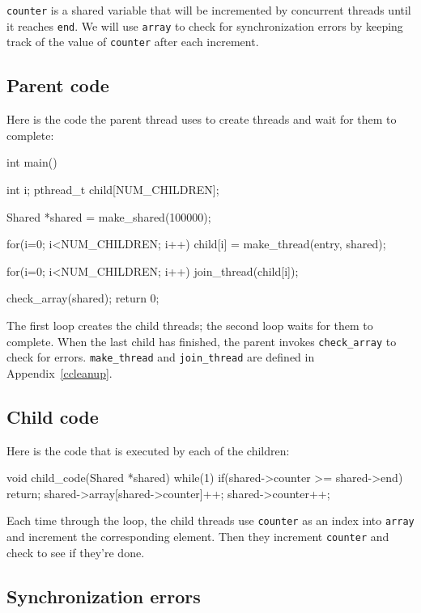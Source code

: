 \documentclass{book}
\begin{document}
{\tt counter} is a shared variable that will be incremented by
concurrent threads until it reaches {\tt end}.  We will use
    {\tt array} to check for synchronization errors by keeping track
of the value of {\tt counter} after each increment.

\subsection{Parent code}

Here is the code the parent thread uses to create threads
and wait for them to complete:

\begin{unbreakable}[]{}
int main() {
 int i;
 pthread_t child[NUM_CHILDREN];

 Shared *shared = make_shared(100000);

 for(i=0; i<NUM_CHILDREN; i++) {
  child[i] = make_thread(entry, shared);
 }

 for(i=0; i<NUM_CHILDREN; i++) {
  join_thread(child[i]);
 }

 check_array(shared);
 return 0;
}
\end{unbreakable}

The first loop creates the child threads; the second loop waits
for them to complete.  When the last child has finished, the parent
invokes {\tt check\_array} to check for errors.
    {\tt make\_thread} and {\tt join\_thread} are defined in
Appendix~\ref{ccleanup}.

\subsection{Child code}

Here is the code that is executed by each of the children:

\begin{unbreakable}[]{}
void child_code(Shared *shared) {
  while(1) {
    if(shared->counter >= shared->end) {
      return;
    }
    shared->array[shared->counter]++;
    shared->counter++;
  }
}
\end{unbreakable}

Each time through the loop, the child threads use {\tt counter}
as an index into {\tt array} and increment the corresponding element.
Then they increment {\tt counter} and check to see if they're done.

\subsection{Synchronization errors}
\end{document}
